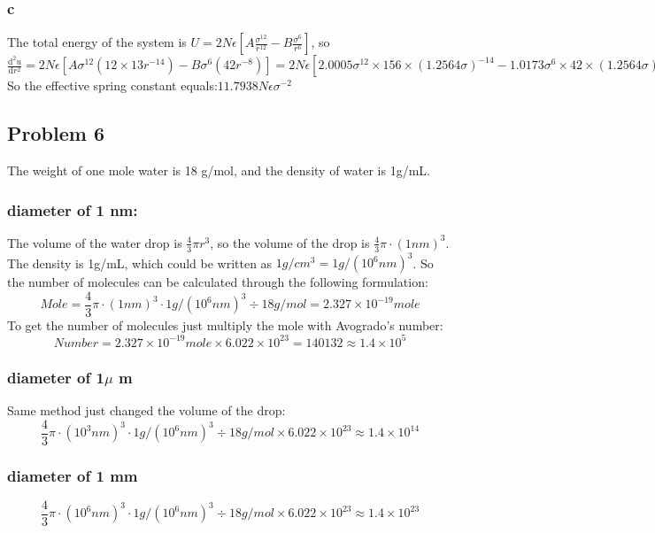 \documentclass[a4paper]{article}
\begin{document}
\subsubsection{c}
The total energy of the system is $U=2N \epsilon [A\frac{\sigma^{12}}{r^{12}}-B\frac{\sigma^{6}}{r^{6}}]$, so $\frac{\mathrm{d^{2}}u}{\mathrm{d}r^{2}}=2N \epsilon [A \sigma^{12}(12 \times 13 r^{-14})-B \sigma^{6}(42 r^{-8})]=2N\epsilon [2.0005\sigma^{12} \times 156 \times(1.2564 \sigma)^{-14}-1.0173\sigma^{6}\times 42 \times (1.2564 \sigma)^{-8}]$
So the effective spring constant equals:$11.7938N\epsilon \sigma^{-2}$

\subsection{Problem 6}
The weight of one mole water is 18 g/mol, and the density of water is 1g/mL.
\subsubsection{diameter of 1 nm:} The volume of the water drop is $\frac{4}{3}\pi r^{3}$, so the volume of the drop is $\frac{4}{3}\pi \cdot (1 nm)^{3}$. The density is 1g/mL, which could be written as $1g/cm^{3}=1g/(10^{6}nm)^{3}$. So the number of molecules can be calculated through the following formulation:
\begin{equation}
	Mole=\frac{4}{3}\pi \cdot (1 nm)^{3} \cdot 1g/(10^{6}nm)^{3} \div 18 g/mol=2.327 \times 10^{-19} mole 
\end{equation}
To get the number of molecules just multiply the mole with Avogrado's number:
\begin{equation}
	Number =2.327 \times 10^{-19} mole \times 6.022 \times 10^{23}=140132 \approx 1.4 \times 10^{5}
\end{equation}

\subsubsection{diameter of 1$\mu$ m}
Same method just changed the volume of the drop:
\begin{equation}
	\frac{4}{3}\pi \cdot (10^{3} nm)^{3} \cdot 1g/(10^{6}nm)^{3} \div 18 g/mol \times 6.022 \times 10^{23} \approx 1.4 \times 10^{14}
\end{equation}

\subsubsection{diameter of 1 mm}
\begin{equation}
	\frac{4}{3}\pi \cdot (10^{6} nm)^{3} \cdot 1g/(10^{6}nm)^{3} \div 18 g/mol \times 6.022 \times 10^{23} \approx 1.4 \times 10^{23}
\end{equation}
\end{document}
